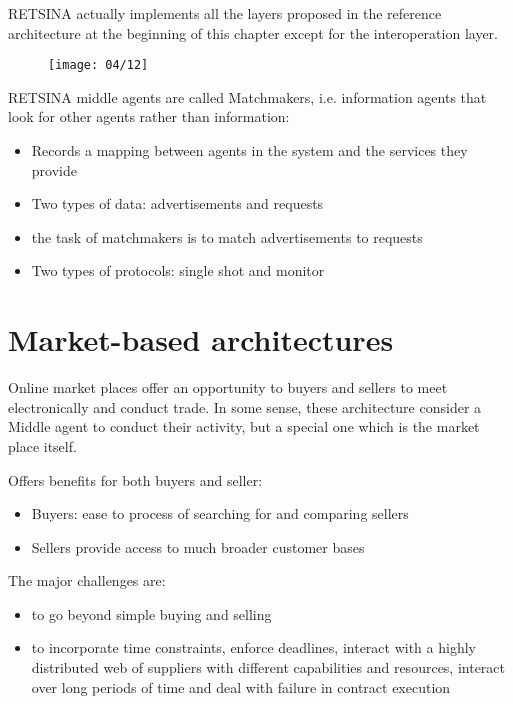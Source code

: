 RETSINA actually implements all the layers proposed in the reference architecture at the beginning of this chapter except for the interoperation layer.

\begin{figure}[!h]
\centering
\texttt{[image: 04/12]}
\end{figure}

RETSINA middle agents are called Matchmakers, i.e. information agents that look for other agents rather than information:
\begin{itemize}
\item Records a mapping between agents in the system and the services they provide
\item Two types of data: advertisements and requests
\item the task of matchmakers is to match advertisements to requests
\item Two types of protocols: single shot and monitor
\end{itemize}


\section{Market-based architectures}
Online market places offer an opportunity to buyers and sellers to meet electronically and conduct trade. In some sense, these architecture consider a Middle agent to conduct their activity, but a special one which is the market place itself.

Offers benefits for both buyers and seller:
\begin{itemize}
\item Buyers: ease to process of searching for and comparing sellers
\item Sellers provide access to much broader customer bases
\end{itemize}

The major challenges are:
\begin{itemize}
\item to go beyond simple buying and selling
\item to incorporate time constraints, enforce deadlines, interact with a highly distributed web of suppliers with different capabilities and resources, interact over long periods of time and deal with failure in contract execution
\end{itemize}

